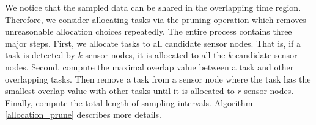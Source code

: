\documentclass[prodmode,acmtosn]{acmsmall}
\begin{document}
We notice that the sampled data can be shared in the overlapping time region. Therefore, we consider allocating tasks via the pruning operation which removes unreasonable allocation choices repeatedly. The entire process contains three major steps. First, we allocate tasks to all candidate sensor nodes. That is, if a task is detected by $k$ sensor nodes, it is allocated to all the $k$ candidate sensor nodes. Second, compute the maximal overlap value between a task and other overlapping tasks. Then remove a task from a sensor node where the task has the smallest overlap value with other tasks until it is allocated to $r$ sensor nodes. Finally, compute the total length of sampling intervals. Algorithm \ref{allocation_prune} describes more details.

\end{document}
